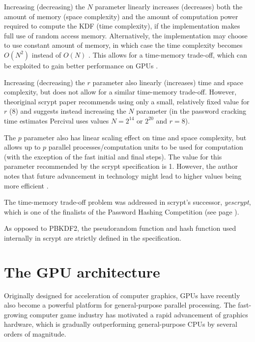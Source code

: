 \documentclass[12pt,oneside]{fithesis2}
\begin{document}
      Increasing (decreasing) the $N$ parameter linearly increases (decreases) both the amount of memory (space complexity) and the amount of computation power required to compute the KDF (time complexity), if the implementation makes full use of random access memory. Alternatively, the implementation may choose to use constant amount of memory, in which case the time complexity becomes $O(N^2)$ instead of $O(N)$ \cite[chapter 5, proof of theorem 1]{scrypt}. This allows for a time-memory trade-off, which can be exploited to gain better performance on GPUs \cite{scrypt:tradeoff, openwall:pwHashing}.
      
      Increasing (decreasing) the $r$ parameter also linearly (increases) time and space complexity, but does not allow for a similar time-memory trade-off. However, theoriginal scrypt paper recommends using only a small, relatively fixed value for $r$ (8) and suggests instead increasing the $N$ parameter (in the password cracking time estimates \cite[chapter 8]{scrypt} Percival uses values $N = 2^{14}$ or $2^{20}$ and $r = 8$).
      
      The $p$ parameter also has linear scaling effect on time and space complexity, but allows up to $p$ parallel processes/computation units to be used for computation (with the exception of the fast initial and final steps). The value for this parameter recommended by the scrypt specification is 1. However, the author notes that future advancement in technology might lead to higher values being more efficient \cite[chapter 7]{scrypt}.
      
      The time-memory trade-off problem was addressed in scrypt's successor, \emph{yescrypt}, which is one of the finalists of the Password Hashing Competition (see page \pageref{p:phc}).
      
      As opposed to PBKDF2, the pseudorandom function and hash function used internally in scrypt are strictly defined in the specification.
      
    \chapter{The GPU architecture} \label{ch:gpuArch}
      Originally designed for acceleration of computer graphics, GPUs have recently also become a powerful platform for general-purpose parallel processing. The fast-growing computer game industry has motivated a rapid advancement of graphics hardware, which is gradually outperforming general-purpose CPUs by several orders of magnitude.
      
\end{document}

